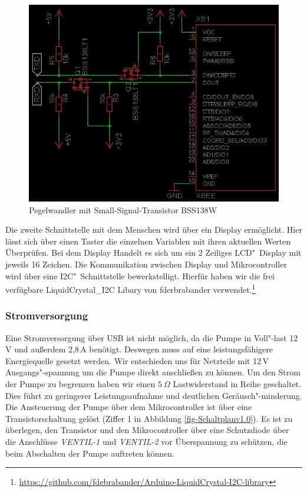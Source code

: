 \begin{figure}
	\centering
	\includegraphics[width=0.8\linewidth]{bilder/v1SchaltplanXbee.jpg}
	\caption{Pegelwandler mit Small-Signal-Transistor BSS138W }
	\label{fig-Pegel}
\end{figure}
		
Die zweite Schnittstelle mit dem Menschen wird über ein Display ermöglicht. 
Hier lässt sich über einen Taster die einzelnen Variablen mit ihren aktuellen Werten Überprüfen. 
Bei dem Display Handelt es sich um ein 2 Zeiliges LCD"~Display mit jeweils 16 Zeichen. 
Die Kommunikation zwischen Display und Mikrocontroller wird über eine I2C"~Schnittstelle bewerkstelligt. 
Hierfür haben wir die frei verfügbare \mbox{LiquidCrystal\_I2C} Libary von fderbrabander verwendet.\footnote{\href{https://github.com/fdebrabander/Arduino-LiquidCrystal-I2C-library}{https://github.com/fdebrabander/Arduino-LiquidCrystal-I2C-library}}
	
	
\subsubsection{Stromversorgung}

Eine Stromversorgung über USB ist nicht möglich, da die Pumpe in Voll"-last 12\,V und außerdem 2,8\,A benötigt. 
Deswegen muss auf eine leistungsfähigere Energiequelle gesetzt werden.
Wir entschieden uns für Netzteile mit 12\,V Ausgangs"-spannung um die Pumpe direkt anschließen zu können. 
Um den Strom der Pumpe zu begrenzen haben wir einen \begin{math}5~\Omega\end{math} Lastwiderstand in Reihe geschaltet.
Dies führt zu geringerer Leistungsaufnahme und deutlichen Geräusch"-minderung.
Die Ansteuerung der Pumpe über dem Mikrocontroller ist über eine Transistorschaltung gelöst (Ziffer 1 in Abbildung \ref{fig-Schaltplanv1.0}).
Es ist zu überlegen, den Transistor und den Mikrocontroller über eine Schutzdiode über die Anschlüsse \emph{VENTIL-1} und \emph{VENTIL-2} vor Überspannung zu schützen, die beim Abschalten der Pumpe auftreten können. 
 

